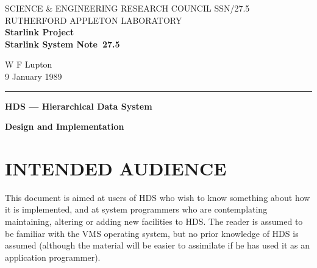 \pagestyle{myheadings}

\newcommand{\stardoccategory}  {Starlink System Note}
\newcommand{\stardocinitials}  {SSN}
\newcommand{\stardocnumber}    {27.5}
\newcommand{\stardocauthors}   {W F Lupton}
\newcommand{\stardocdate}      {9 January 1989}
\newcommand{\stardoctitle}     {HDS --- Hierarchical Data System}

\newcommand{\stardocname}{\stardocinitials /\stardocnumber}
\markright{\stardocname}
\setlength{\textwidth}{160mm}
\setlength{\textheight}{240mm}
\setlength{\topmargin}{-5mm}
\setlength{\oddsidemargin}{0mm}
\setlength{\evensidemargin}{0mm}
\setlength{\parindent}{0mm}
\setlength{\parskip}{\medskipamount}
\setlength{\unitlength}{1mm}


\thispagestyle{empty}
SCIENCE \& ENGINEERING RESEARCH COUNCIL \hfill \stardocname\\
RUTHERFORD APPLETON LABORATORY\\
{\large\bf Starlink Project\\}
{\large\bf \stardoccategory\ \stardocnumber}
\begin{flushright}
\stardocauthors\\
\stardocdate
\end{flushright}
\vspace{-4mm}
\rule{\textwidth}{0.5mm}
\vspace{5mm}
\begin{center}
{\Large\bf \stardoctitle}

\vspace {5mm}

{\large\bf Design and Implementation}
\end{center}
\vspace{5mm}

\setlength{\parskip}{0mm}
\tableofcontents
\listoftables
\listoffigures
\setlength{\parskip}{\medskipamount}
\markright{\stardocname}

\newpage
\section {INTENDED AUDIENCE}

This document is aimed at users of HDS who wish to know something about how it
is implemented, and at system programmers who are contemplating maintaining,
altering or adding new facilities to HDS. The reader is assumed to be familiar
with the VMS operating system, but no prior knowledge of HDS is assumed
(although the material will be easier to assimilate if he has used it as an
application programmer).

